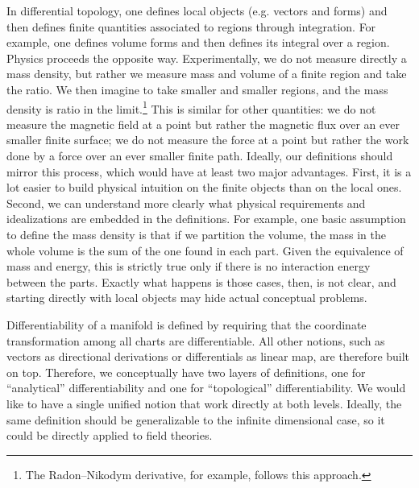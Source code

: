 \documentclass[10pt,twocolumn, nofootinbib]{revtex4-2}
\begin{document}
In differential topology, one defines local objects (e.g. vectors and forms) and then defines finite quantities associated to regions through integration. For example, one defines volume forms and then defines its integral over a region. Physics proceeds the opposite way. Experimentally, we do not measure directly a mass density, but rather we measure mass and volume of a finite region and take the ratio. We then imagine to take smaller and smaller regions, and the mass density is ratio in the limit.\footnote{The Radon–Nikodym derivative, for example, follows this approach.} This is similar for other quantities: we do not measure the magnetic field at a point but rather the magnetic flux over an ever smaller finite surface; we do not measure the force at a point but rather the work done by a force over an ever smaller finite path. Ideally, our definitions should mirror this process, which would have at least two major advantages. First, it is a lot easier to build physical intuition on the finite objects than on the local ones. Second, we can understand more clearly what physical requirements and idealizations are embedded in the definitions. For example, one basic assumption to define the mass density is that if we partition the volume, the mass in the whole volume is the sum of the one found in each part. Given the equivalence of mass and energy, this is strictly true only if there is no interaction energy between the parts. Exactly what happens is those cases, then, is not clear, and starting directly with local objects may hide actual conceptual problems.

Differentiability of a manifold is defined by requiring that the coordinate transformation among all charts are differentiable. All other notions, such as vectors as directional derivations or differentials as linear map, are therefore built on top. Therefore, we conceptually have two layers of definitions, one for ``analytical'' differentiability and one for ``topological'' differentiability. We would like to have a single unified notion that work directly at both levels. Ideally, the same definition should be generalizable to the infinite dimensional case, so it could be directly applied to field theories.
\end{document}
